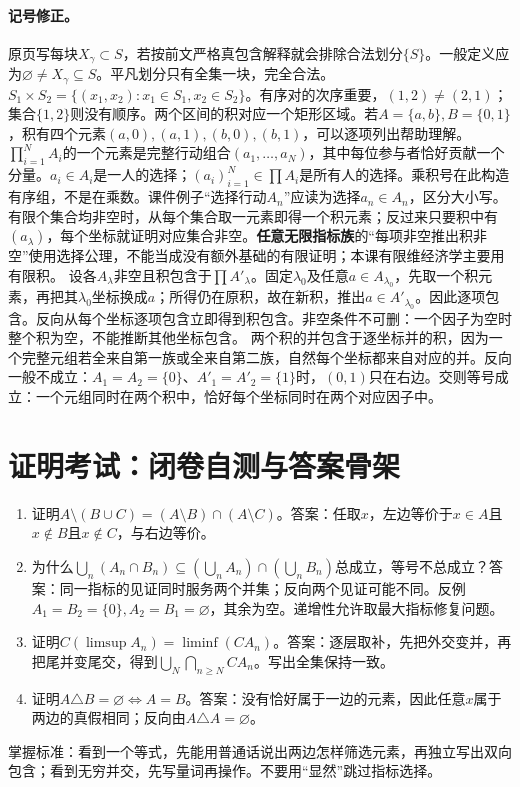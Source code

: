 \paragraph{记号修正。}原页写每块$X_\gamma\subset S$，若按前文严格真包含解释就会排除合法划分$\{S\}$。一般定义应为$\varnothing\ne X_\gamma\subseteq S$。平凡划分只有全集一块，完全合法。
$S_1\times S_2=\{(x_1,x_2):x_1\in S_1,x_2\in S_2\}$。有序对的次序重要，$(1,2)\ne(2,1)$；集合$\{1,2\}$则没有顺序。两个区间的积对应一个矩形区域。若$A=\{a,b\},B=\{0,1\}$，积有四个元素$(a,0),(a,1),(b,0),(b,1)$，可以逐项列出帮助理解。
$\prod_{i=1}^N A_i$的一个元素是完整行动组合$(a_1,\ldots,a_N)$，其中每位参与者恰好贡献一个分量。$a_i\in A_i$是一人的选择；$(a_i)_{i=1}^N\in\prod A_i$是所有人的选择。乘积号在此构造有序组，不是在乘数。课件例子“选择行动$A_n$”应读为选择$a_n\in A_n$，区分大小写。
有限个集合均非空时，从每个集合取一元素即得一个积元素；反过来只要积中有$(a_\lambda)$，每个坐标就证明对应集合非空。\textbf{任意无限指标族}的“每项非空推出积非空”使用选择公理，不能当成没有额外基础的有限证明；本课有限维经济学主要用有限积。
设各$A_\lambda$非空且积包含于$\prod A'_\lambda$。固定$\lambda_0$及任意$a\in A_{\lambda_0}$，先取一个积元素，再把其$\lambda_0$坐标换成$a$；所得仍在原积，故在新积，推出$a\in A'_{\lambda_0}$。因此逐项包含。反向从每个坐标逐项包含立即得到积包含。非空条件不可删：一个因子为空时整个积为空，不能推断其他坐标包含。
两个积的并包含于逐坐标并的积，因为一个完整元组若全来自第一族或全来自第二族，自然每个坐标都来自对应的并。反向一般不成立：$A_1=A_2=\{0\}$、$A'_1=A'_2=\{1\}$时，$(0,1)$只在右边。交则等号成立：一个元组同时在两个积中，恰好每个坐标同时在两个对应因子中。

\section*{证明考试：闭卷自测与答案骨架}
\begin{enumerate}
\item 证明$A\setminus(B\cup C)=(A\setminus B)\cap(A\setminus C)$。答案：任取$x$，左边等价于$x\in A$且$x\notin B$且$x\notin C$，与右边等价。
\item 为什么$\bigcup_n(A_n\cap B_n)\subseteq(\bigcup_nA_n)\cap(\bigcup_nB_n)$总成立，等号不总成立？答案：同一指标的见证同时服务两个并集；反向两个见证可能不同。反例$A_1=B_2=\{0\},A_2=B_1=\varnothing$，其余为空。递增性允许取最大指标修复问题。
\item 证明$C(\limsup A_n)=\liminf(CA_n)$。答案：逐层取补，先把外交变并，再把尾并变尾交，得到$\bigcup_N\bigcap_{n\ge N}CA_n$。写出全集保持一致。
\item 证明$A\triangle B=\varnothing\iff A=B$。答案：没有恰好属于一边的元素，因此任意$x$属于两边的真假相同；反向由$A\triangle A=\varnothing$。
\end{enumerate}
掌握标准：看到一个等式，先能用普通话说出两边怎样筛选元素，再独立写出双向包含；看到无穷并交，先写量词再操作。不要用“显然”跳过指标选择。
